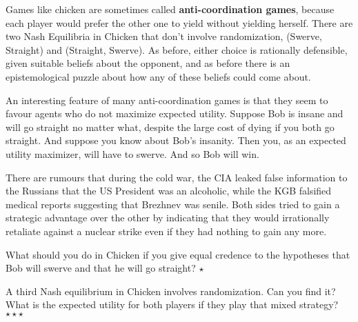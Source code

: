Games like chicken are sometimes called \textbf{anti-coordination
  games}, because each player would prefer the other one to yield
without yielding herself.  There are two Nash Equilibria in Chicken
that don't involve randomization, (Swerve, Straight) and (Straight,
Swerve). As before, either choice is rationally defensible, given
suitable beliefs about the opponent, and as before there is an
epistemological puzzle about how any of these beliefs could come
about.

An interesting feature of many anti-coordination games is that they
seem to favour agents who do not maximize expected utility. Suppose
Bob is insane and will go straight no matter what, despite the large
cost of dying if you both go straight. And suppose you know about
Bob's insanity. Then you, as an expected utility maximizer, will have
to swerve. And so Bob will win.

There are rumours that during the cold war, the CIA leaked false
information to the Russians that the US President was an alcoholic,
while the KGB falsified medical reports suggesting that Brezhnev was
senile. Both sides tried to gain a strategic advantage over the other
by indicating that they would irrationally retaliate against a nuclear
strike even if they had nothing to gain any more.

\begin{exercise}
  What should you do in Chicken if you give equal credence to the
  hypotheses that Bob will swerve and that he will go straight? $\star$
\end{exercise}

\begin{exercise}
  A third Nash equilibrium in Chicken involves randomization. Can you
  find it?  What is the expected utility for both players if they play
  that mixed strategy?  $\star\star\star$
\end{exercise}



